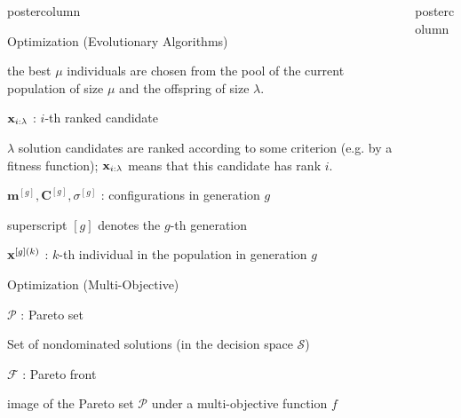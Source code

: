 \documentclass[11pt,compress,t,notes=noshow, xcolor=table]{beamer}
\newlength{\columnheight} %
\begin{document}
\begin{frame}[fragile]{}
\begin{columns}
\begin{column}{.31\textwidth}
\begin{beamercolorbox}[center]{postercolumn}
\begin{minipage}{.98\textwidth}
{\begin{myblock}{Optimization (Evolutionary Algorithms)}
\begin{codebox}
						\end{codebox}
						\hspace*{1ex} the best $\mu$ individuals are chosen from the pool of the current population of size $\mu$ and the offspring of size $\lambda$. \\
						\begin{codebox}
							 $\mathbf{x}_{i:\lambda}$ : $i$-th ranked candidate
						\end{codebox}
						\hspace*{1ex} $\lambda$ solution candidates are ranked according to some criterion (e.g. by a fitness function); $\mathbf{x}_{i:\lambda}$ means that this candidate has rank $i$. \\
						\begin{codebox}
							 $\bm{m}^{[g]}, \bm{C}^{[g]}, \sigma^{[g]}$ : configurations in generation $g$
						\end{codebox}
						\hspace*{1ex} superscript $[g]$ denotes the $g$-th generation \\
						\begin{codebox}
							 $\mathbf{x}^{[g](k)}$ : $k$-th individual in the population in generation $g$
						\end{codebox}
						\end{myblock}
						\begin{myblock}{Optimization (Multi-Objective)}
						\begin{codebox}
							 $\mathcal{P}$ : Pareto set
						\end{codebox}
						\hspace*{1ex} Set of nondominated solutions (in the decision space $\mathcal{S}$) \\
						\begin{codebox}
							 $\mathcal{F}$ : Pareto front
						\end{codebox}
						\hspace*{1ex} image of the Pareto set $\mathcal{P}$ under a multi-objective function $f$ \\
					\end{myblock}

				}
			\end{minipage}
		\end{beamercolorbox}
	\end{column}
    \begin{column}{.31\textwidth}
	       	\begin{beamercolorbox}[center]{postercolumn}
			     \begin{minipage}{.98\textwidth}
				    \parbox[t][\columnheight]{\textwidth}{
                    }
			\end{minipage}
		\end{beamercolorbox}
	\end{column}
\end{columns}
\end{frame}
\end{document}
